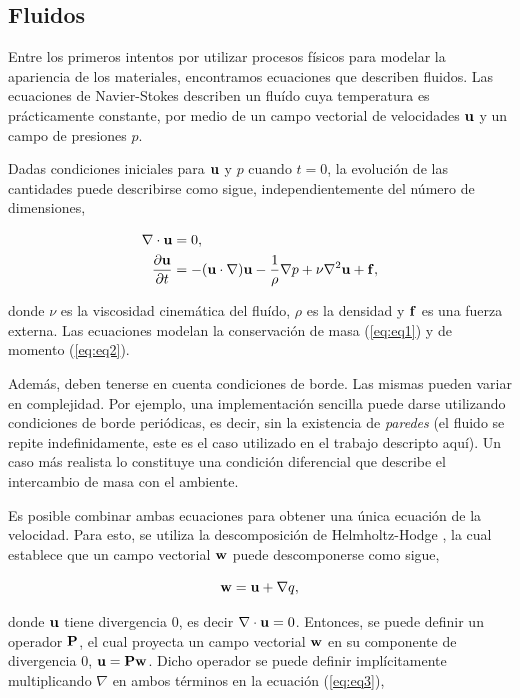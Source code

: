 \subsection{Fluidos}
Entre los primeros intentos por utilizar procesos físicos para modelar la apariencia de los materiales, encontramos ecuaciones que describen fluidos.
Las ecuaciones de Navier-Stokes describen un fluído cuya temperatura es prácticamente constante, por medio de un campo vectorial de velocidades $\bold{u}$ y un campo de presiones $p$.

Dadas condiciones iniciales para $\bold{u}$ y $p$ cuando $t = 0$, la evolución de las cantidades puede describirse como sigue, independientemente del número de dimensiones,

\begin{align}
\nabla \cdot \bold{u} &= 0, \label{eq:eq1}\\
\frac{\partial \bold{u} }{\partial t} &= - (\bold{u} \cdot \nabla) \bold{u} - \frac{1}{\rho} \nabla p + \nu \nabla^{2} \bold{u} + \bold{f} \label{eq:eq2},
\end{align}

donde $\nu$ es la viscosidad cinemática del fluído, $\rho$ es la densidad y $\bold{f}$ es una fuerza externa.
Las ecuaciones modelan la conservación de masa (\ref{eq:eq1}) y de momento (\ref{eq:eq2}).

Además, deben tenerse en cuenta condiciones de borde.
Las mismas pueden variar en complejidad.
Por ejemplo, una implementación sencilla puede darse utilizando condiciones de borde periódicas, es decir, sin la existencia de {\em paredes} (el fluido se repite indefinidamente, este es el caso utilizado en el trabajo descripto aquí).
Un caso más realista lo constituye una condición diferencial que describe el intercambio de masa con el ambiente.

Es posible combinar ambas ecuaciones para obtener una única ecuación de la velocidad.
Para esto, se utiliza la descomposición de Helmholtz-Hodge \cite{Chorin1990}, la cual establece que un campo vectorial $\bold{w}$ puede descomponerse como sigue, 

\begin{equation}
\label{eq:eq3}
\bold{w} = \bold{u} + \nabla q,
\end{equation}

donde $\bold{u}$ tiene divergencia $0$, es decir $\nabla\cdot\bold{u} = 0$.
Entonces, se puede definir un operador $\bold{P}$, el cual proyecta un campo vectorial $\bold{w}$ en su componente de divergencia $0$, $\bold{u} = \bold{P}\bold{w}$.
Dicho operador se puede definir implícitamente multiplicando $\nabla$ en ambos términos en la ecuación (\ref{eq:eq3}),

